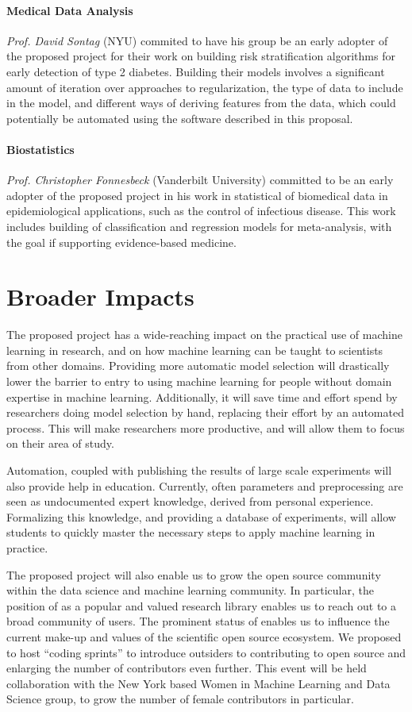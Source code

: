 \paragraph{Medical Data Analysis}
\emph{Prof. David Sontag} (NYU) commited to
have his group be an early adopter of the proposed project for their
work on building risk stratification algorithms for early detection of type 2 diabetes.
Building their models involves a significant amount of iteration over
approaches to regularization, the type of data to include in the model, and
different ways of deriving features from the data, which could potentially be
automated using the software described in this proposal.

\paragraph{Biostatistics}
\emph{Prof. Christopher Fonnesbeck} (Vanderbilt
University) committed to be an early adopter of the proposed project in
his work in statistical of biomedical data in epidemiological
applications, such as the control of infectious disease. This work
includes building of classification and regression models for
meta-analysis, with the goal if supporting evidence-based medicine.

\section{Broader Impacts}
The proposed project has a wide-reaching impact on the practical use of
machine learning in research, and on how machine learning can be taught to
 scientists from other domains.
Providing more automatic model selection will drastically lower the barrier
to entry to using machine learning for people without domain expertise
in machine learning.
Additionally, it will save time and effort spend by researchers doing
model selection by hand, replacing their effort by an automated process.
This will make researchers more productive, and will allow them to focus
on their area of study.

Automation, coupled with publishing the results of large scale experiments will
also provide help in education. Currently, often parameters and preprocessing
are seen as undocumented expert knowledge, derived from personal experience.
Formalizing this knowledge, and providing a database of experiments, will allow
students to quickly master the necessary steps to apply machine learning in
practice.

The proposed project will also enable us to grow the open source community
within the data science and machine learning community.  In particular, the
position of \sklearn{} as a popular and valued research library enables us to
reach out to a broad community of users.  The prominent status of \sklearn{}
enables us to influence the current make-up and values of the scientific open
source ecosystem.  We proposed to host ``coding sprints'' to introduce
outsiders to contributing to open source and enlarging the number of
contributors even further. This event will be held collaboration with the New
York based Women in Machine Learning and Data Science group, to grow the number
of female contributors in particular. 

